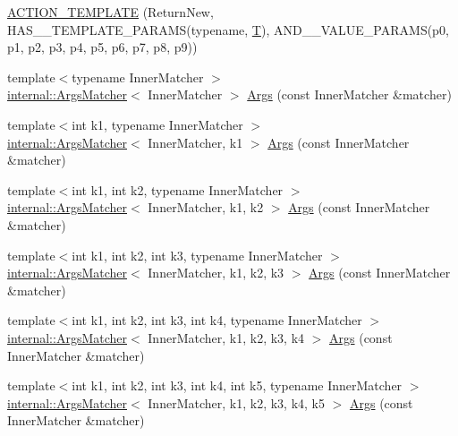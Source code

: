 \begin{DoxyCompactItemize}
\item 
\hyperlink{namespacetesting_a3934a47f6125504c939a3573b7fc55c4}{A\+C\+T\+I\+O\+N\+\_\+\+T\+E\+M\+P\+L\+A\+TE} (Return\+New, H\+A\+S\+\_\+\_\+\+T\+E\+M\+P\+L\+A\+T\+E\+\_\+\+P\+A\+R\+A\+MS(typename, \hyperlink{functions__7_8js_adf1f3edb9115acb0a1e04209b7a9937b}{T}), A\+N\+D\+\_\+\_\+\+V\+A\+L\+U\+E\+\_\+\+P\+A\+R\+A\+MS(p0, p1, p2, p3, p4, p5, p6, p7, p8, p9))
\item 
{\footnotesize template$<$typename Inner\+Matcher $>$ }\\\hyperlink{classtesting_1_1internal_1_1_args_matcher}{internal\+::\+Args\+Matcher}$<$ Inner\+Matcher $>$ \hyperlink{namespacetesting_aaca153f67b689b8b9d5b8c67ecf8cee4}{Args} (const Inner\+Matcher \&matcher)
\item 
{\footnotesize template$<$int k1, typename Inner\+Matcher $>$ }\\\hyperlink{classtesting_1_1internal_1_1_args_matcher}{internal\+::\+Args\+Matcher}$<$ Inner\+Matcher, k1 $>$ \hyperlink{namespacetesting_af67bac6da407df7586f60cfa2c9b602d}{Args} (const Inner\+Matcher \&matcher)
\item 
{\footnotesize template$<$int k1, int k2, typename Inner\+Matcher $>$ }\\\hyperlink{classtesting_1_1internal_1_1_args_matcher}{internal\+::\+Args\+Matcher}$<$ Inner\+Matcher, k1, k2 $>$ \hyperlink{namespacetesting_a663409e441584c81f496e9c98fd3453c}{Args} (const Inner\+Matcher \&matcher)
\item 
{\footnotesize template$<$int k1, int k2, int k3, typename Inner\+Matcher $>$ }\\\hyperlink{classtesting_1_1internal_1_1_args_matcher}{internal\+::\+Args\+Matcher}$<$ Inner\+Matcher, k1, k2, k3 $>$ \hyperlink{namespacetesting_abd3ddae153e1c452b7625808cc4d820b}{Args} (const Inner\+Matcher \&matcher)
\item 
{\footnotesize template$<$int k1, int k2, int k3, int k4, typename Inner\+Matcher $>$ }\\\hyperlink{classtesting_1_1internal_1_1_args_matcher}{internal\+::\+Args\+Matcher}$<$ Inner\+Matcher, k1, k2, k3, k4 $>$ \hyperlink{namespacetesting_aeff7e644fd00516c3519fe8c0dc1aee2}{Args} (const Inner\+Matcher \&matcher)
\item 
{\footnotesize template$<$int k1, int k2, int k3, int k4, int k5, typename Inner\+Matcher $>$ }\\\hyperlink{classtesting_1_1internal_1_1_args_matcher}{internal\+::\+Args\+Matcher}$<$ Inner\+Matcher, k1, k2, k3, k4, k5 $>$ \hyperlink{namespacetesting_aede9fd33cce0d21f5e31ba10a0706827}{Args} (const Inner\+Matcher \&matcher)

\end{DoxyCompactItemize}
